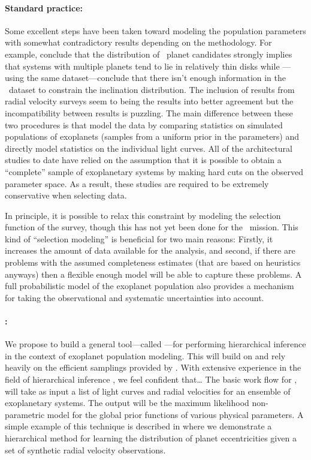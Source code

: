 \documentclass[letterpaper,12pt,preprint]{hack_aastex}
\newcommand{\Bart}{\package{Bart}}
\newcommand{\TheCreator}{\package{TheCreator}}
\begin{document}
\paragraph{Standard practice:}
Some excellent steps have been taken toward modeling the population
parameters \citep[][for example]{lissauer,tremaine,fang} with somewhat
contradictory results depending on the methodology.
For example, \citet{fang} conclude that the distribution of \Kepler\ planet
candidates strongly implies that systems with multiple planets tend to lie in
relatively thin disks while \citet{tremaine}---using the same
dataset---conclude that there isn't enough information in the \Kepler\ dataset
to constrain the inclination distribution.
The inclusion of results from radial velocity surveys seem to being the
results into better agreement but the incompatibility between results is
puzzling.
The main difference between these two procedures is that \citet{fang} model
the data by comparing statistics on simulated populations of exoplanets
 (samples from a uniform prior in the parameters) and \citet{tremaine}
directly model statistics on the individual light curves.
All of the architectural studies to date have relied on the assumption that it
is possible to obtain a ``complete'' sample of exoplanetary systems by making
hard cuts on the observed parameter space.
As a result, these studies are required to be extremely conservative when
selecting data.

In principle, it is possible to relax this constraint by modeling the selection function of
the survey, though this has not yet been done for the \Kepler\ mission.
This kind of ``selection modeling'' is beneficial for two main reasons: Firstly, it increases the amount of data
available for the analysis, and second, if there are problems with the assumed
completeness estimates (that are based on heuristics anyways) then a flexible
enough model will be able to capture these problems.
A full probabilistic model of the exoplanet population also provides a
mechanism for taking the observational and systematic uncertainties into
account.


\paragraph{\TheCreator:}
We propose to build a general tool---called \TheCreator---for performing
hierarchical inference in the context of exoplanet population modeling.
This will build on and rely heavily on the efficient samplings provided by
\Bart.
With extensive experience in the field of hierarchical inference
\citep{xd,hogg-ecc,stargal}, we feel confident that\ldots
The basic work flow for \TheCreator, will take as input a list of light
curves and radial velocities for an ensemble of exoplanetary systems.
The output will be the maximum likelihood non-parametric model for the global
prior functions of various physical parameters.
A simple example of this technique is described in \citet{hogg-ecc} where we
demonstrate a hierarchical method for learning the distribution of planet
eccentricities given a set of synthetic radial velocity observations.
\end{document}
